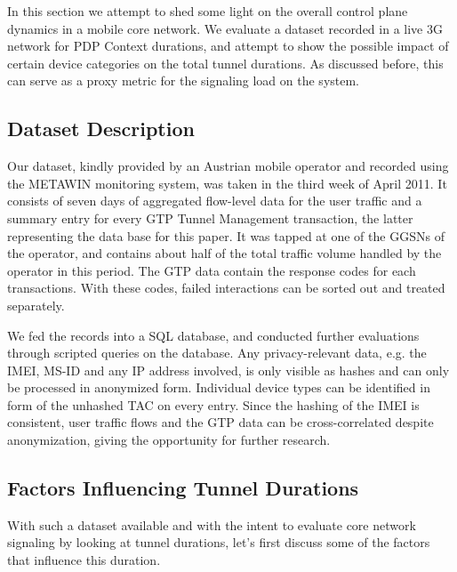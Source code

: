 

In this section we attempt to shed some light on the overall control plane dynamics in a mobile core network. We evaluate a dataset recorded in a live 3G network for PDP Context durations, and attempt to show the possible impact of certain device categories on the total tunnel durations. As discussed before, this can serve as a proxy metric for the signaling load on the system. 


\subsection{Dataset Description}
Our dataset, kindly provided by an Austrian mobile operator and recorded using the \gls{METAWIN} monitoring system, was taken in the third week of April 2011. It consists of seven days of aggregated flow-level data for the user traffic and a summary entry for every \gls{GTP} Tunnel Management transaction, the latter representing the data base for this paper. It was tapped at one of the \glspl{GGSN} of the operator, and contains about half of the total traffic volume handled by the operator in this period. The \gls{GTP} data contain the response codes for each transactions. With these codes, failed interactions can be sorted out and treated separately.

We fed the records into a SQL database, and conducted further evaluations through scripted queries on the database. Any privacy-relevant data, e.g. the \gls{IMEI}, \gls{MS-ID} and any IP address involved, is only visible as hashes and can only be processed in anonymized form. Individual device types can be identified in form of the unhashed \gls{TAC} on every entry. Since the hashing of the \gls{IMEI} is consistent, user traffic flows and the \gls{GTP} data can be cross-correlated despite anonymization, giving the opportunity for further research.

 

\subsection{Factors Influencing Tunnel Durations}

With such a dataset available and with the intent to evaluate core network signaling by looking at tunnel durations, let's first discuss some of the factors that influence this duration.

